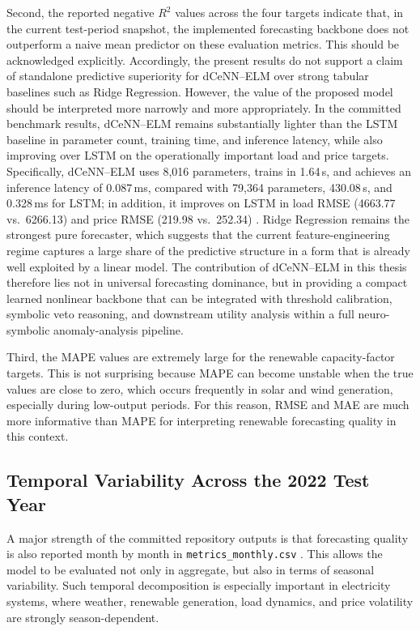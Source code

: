 Second, the reported negative $R^2$ values across the four targets indicate that, in the current test-period snapshot, the implemented forecasting backbone does not outperform a naive mean predictor on these evaluation metrics. This should be acknowledged explicitly. Accordingly, the present results do not support a claim of standalone predictive superiority for dCeNN--ELM over strong tabular baselines such as Ridge Regression. However, the value of the proposed model should be interpreted more narrowly and more appropriately. In the committed benchmark results, dCeNN--ELM remains substantially lighter than the LSTM baseline in parameter count, training time, and inference latency, while also improving over LSTM on the operationally important load and price targets. Specifically, dCeNN--ELM uses 8{,}016 parameters, trains in 1.64\,s, and achieves an inference latency of 0.087\,ms, compared with 79{,}364 parameters, 430.08\,s, and 0.328\,ms for LSTM; in addition, it improves on LSTM in load RMSE (4663.77 vs.\ 6266.13) and price RMSE (219.98 vs.\ 252.34) \cite{repo_thesis_grid_anomaly}. Ridge Regression remains the strongest pure forecaster, which suggests that the current feature-engineering regime captures a large share of the predictive structure in a form that is already well exploited by a linear model. The contribution of dCeNN--ELM in this thesis therefore lies not in universal forecasting dominance, but in providing a compact learned nonlinear backbone that can be integrated with threshold calibration, symbolic veto reasoning, and downstream utility analysis within a full neuro-symbolic anomaly-analysis pipeline.

Third, the MAPE values are extremely large for the renewable capacity-factor targets. This is not surprising because MAPE can become unstable when the true values are close to zero, which occurs frequently in solar and wind generation, especially during low-output periods. For this reason, RMSE and MAE are much more informative than MAPE for interpreting renewable forecasting quality in this context.

\subsection{Temporal Variability Across the 2022 Test Year}

A major strength of the committed repository outputs is that forecasting quality is also reported month by month in \texttt{metrics\_monthly.csv} \cite{repo_thesis_grid_anomaly}. This allows the model to be evaluated not only in aggregate, but also in terms of seasonal variability. Such temporal decomposition is especially important in electricity systems, where weather, renewable generation, load dynamics, and price volatility are strongly season-dependent.

